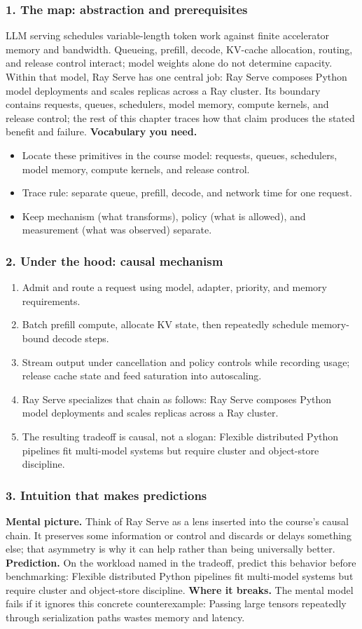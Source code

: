 \subsubsection*{1. The map: abstraction and prerequisites}
LLM serving schedules variable-length token work against finite accelerator memory and bandwidth. Queueing, prefill, decode, KV-cache allocation, routing, and release control interact; model weights alone do not determine capacity.
Within that model, Ray Serve has one central job: Ray Serve composes Python model deployments and scales replicas across a Ray cluster. Its boundary contains requests, queues, schedulers, model memory, compute kernels, and release control; the rest of this chapter traces how that claim produces the stated benefit and failure.
\textbf{Vocabulary you need.}\begin{itemize}
\item Locate these primitives in the course model: requests, queues, schedulers, model memory, compute kernels, and release control.
\item Trace rule: separate queue, prefill, decode, and network time for one request.
\item Keep mechanism (what transforms), policy (what is allowed), and measurement (what was observed) separate.
\end{itemize}
\subsubsection*{2. Under the hood: causal mechanism}\begin{enumerate}
\item Admit and route a request using model, adapter, priority, and memory requirements.
\item Batch prefill compute, allocate KV state, then repeatedly schedule memory-bound decode steps.
\item Stream output under cancellation and policy controls while recording usage; release cache state and feed saturation into autoscaling.
\item Ray Serve specializes that chain as follows: Ray Serve composes Python model deployments and scales replicas across a Ray cluster.
\item The resulting tradeoff is causal, not a slogan: Flexible distributed Python pipelines fit multi-model systems but require cluster and object-store discipline.
\end{enumerate}
\subsubsection*{3. Intuition that makes predictions}
\textbf{Mental picture.} Think of Ray Serve as a lens inserted into the course's causal chain. It preserves some information or control and discards or delays something else; that asymmetry is why it can help rather than being universally better.
\textbf{Prediction.} On the workload named in the tradeoff, predict this behavior before benchmarking: Flexible distributed Python pipelines fit multi-model systems but require cluster and object-store discipline.
\textbf{Where it breaks.} The mental model fails if it ignores this concrete counterexample: Passing large tensors repeatedly through serialization paths wastes memory and latency.
